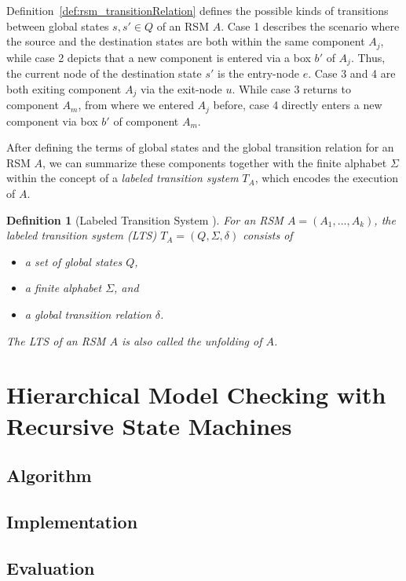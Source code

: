 \documentclass[a4paper, 12pt, twoside]{report}
\theoremstyle{plain}
\newtheorem{definition}[theorem]{Definition}
\begin{document}
	Definition~\ref{def:rsm_transitionRelation} defines the possible kinds of transitions between global states $s, s' \in Q$ of an RSM $A$. Case 1 describes the scenario where the source and the destination states are both within the same component $A_j$, while case 2 depicts that a new component is entered via a box $b'$ of $A_j$. Thus, the current node of the destination state $s'$ is the entry-node $e$. Case 3 and 4 are both exiting component $A_j$ via the exit-node $u$. While case 3 returns to component $A_m$, from where we entered $A_j$ before, case 4 directly enters a new component via box $b'$ of component $A_m$.
	
	
	After defining the terms of global states and the global transition relation for an RSM $A$, we can summarize these components together with the finite alphabet $\Sigma$ within the concept of a \textit{labeled transition system} $T_A$, which encodes the execution of $A$.
	
	\begin{definition}[Labeled Transition System \cite{alur2001analysis}]\label{def:rsm_transitionSystem}
		For an RSM $A=(A_1, ..., A_k)$, the \textup{labeled transition system} (LTS) $T_A=(Q, \Sigma, \delta)$ consists of
		\begin{itemize}
			\item a set of global states $Q$, 
			\item a finite alphabet $\Sigma$, and
			\item a global transition relation $\delta$.
		\end{itemize}		
		The LTS of an RSM $A$ is also called the \textup{unfolding} of $A$.
	\end{definition}
	
	\chapter{Hierarchical Model Checking with Recursive State Machines}	
	\section{Algorithm}
	\section{Implementation}
	\section{Evaluation}
	
\end{document}
